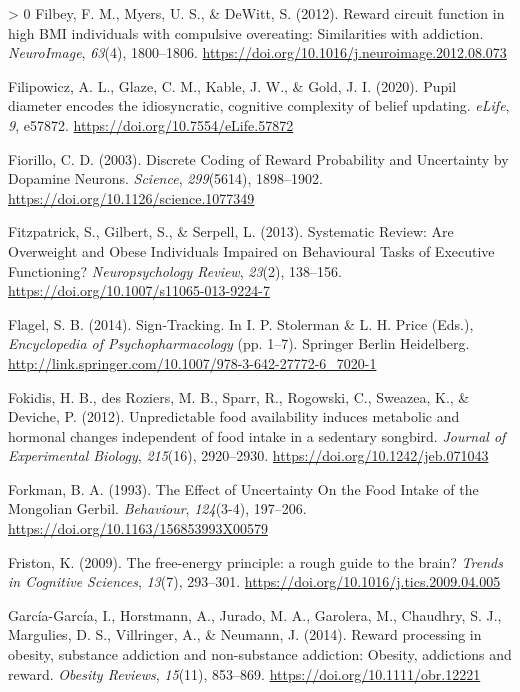 \documentclass[
]{/home/nicoluarte/Downloads/templates/PNAS-template-main.tex}
\newlength{\cslhangindent}
\newenvironment{CSLReferences}[3] %
 {%
  \setlength{\parindent}{0pt}
  \ifodd #1 \everypar{\setlength{\hangindent}{\cslhangindent}}\ignorespaces\fi
  \ifnum #2 > 0
  \setlength{\parskip}{#2\baselineskip}
  \fi
 }%
 {}
\begin{document}
\begin{CSLReferences}{1}{0}
\leavevmode\hypertarget{ref-VWAZILDA}{}%
Filbey, F. M., Myers, U. S., \& DeWitt, S. (2012). Reward circuit
function in high BMI individuals with compulsive overeating:
Similarities with addiction. \emph{NeuroImage}, \emph{63}(4),
1800--1806. \url{https://doi.org/10.1016/j.neuroimage.2012.08.073}

\leavevmode\hypertarget{ref-X6X8T8QT}{}%
Filipowicz, A. L., Glaze, C. M., Kable, J. W., \& Gold, J. I. (2020).
Pupil diameter encodes the idiosyncratic, cognitive complexity of belief
updating. \emph{eLife}, \emph{9}, e57872.
\url{https://doi.org/10.7554/eLife.57872}

\leavevmode\hypertarget{ref-AR2TQB84}{}%
Fiorillo, C. D. (2003). Discrete Coding of Reward Probability and
Uncertainty by Dopamine Neurons. \emph{Science}, \emph{299}(5614),
1898--1902. \url{https://doi.org/10.1126/science.1077349}

\leavevmode\hypertarget{ref-UTKKIKVA}{}%
Fitzpatrick, S., Gilbert, S., \& Serpell, L. (2013). Systematic Review:
Are Overweight and Obese Individuals Impaired on Behavioural Tasks of
Executive Functioning? \emph{Neuropsychology Review}, \emph{23}(2),
138--156. \url{https://doi.org/10.1007/s11065-013-9224-7}

\leavevmode\hypertarget{ref-BDFISDRS}{}%
Flagel, S. B. (2014). Sign-Tracking. In I. P. Stolerman \& L. H. Price
(Eds.), \emph{Encyclopedia of Psychopharmacology} (pp. 1--7). Springer
Berlin Heidelberg.
\url{http://link.springer.com/10.1007/978-3-642-27772-6_7020-1}

\leavevmode\hypertarget{ref-CFC7DN65}{}%
Fokidis, H. B., des Roziers, M. B., Sparr, R., Rogowski, C., Sweazea,
K., \& Deviche, P. (2012). Unpredictable food availability induces
metabolic and hormonal changes independent of food intake in a sedentary
songbird. \emph{Journal of Experimental Biology}, \emph{215}(16),
2920--2930. \url{https://doi.org/10.1242/jeb.071043}

\leavevmode\hypertarget{ref-NL4XYLRH}{}%
Forkman, B. A. (1993). The Effect of Uncertainty On the Food Intake of
the Mongolian Gerbil. \emph{Behaviour}, \emph{124}(3-4), 197--206.
\url{https://doi.org/10.1163/156853993X00579}

\leavevmode\hypertarget{ref-V9CIKRBE}{}%
Friston, K. (2009). The free-energy principle: a rough guide to the
brain? \emph{Trends in Cognitive Sciences}, \emph{13}(7), 293--301.
\url{https://doi.org/10.1016/j.tics.2009.04.005}

\leavevmode\hypertarget{ref-4JUZW55S}{}%
García-García, I., Horstmann, A., Jurado, M. A., Garolera, M., Chaudhry,
S. J., Margulies, D. S., Villringer, A., \& Neumann, J. (2014). Reward
processing in obesity, substance addiction and non-substance addiction:
Obesity, addictions and reward. \emph{Obesity Reviews}, \emph{15}(11),
853--869. \url{https://doi.org/10.1111/obr.12221}


\end{CSLReferences}
\end{document}
